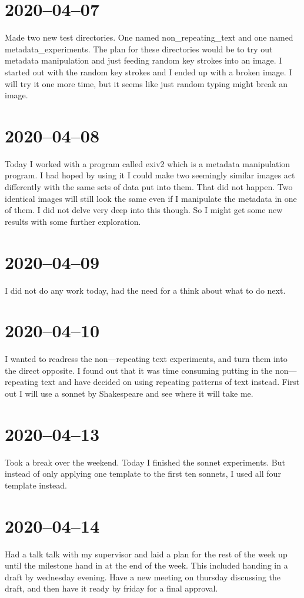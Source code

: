 \documentclass[12pt, letterpaper]{article}
\begin{document}
\section{2020--04--07}
Made two new test directories. One named non\_repeating\_text and one
named metadata\_experiments. The plan for these directories would be to try out
metadata manipulation and just feeding random key strokes into an image. I
started out with the random key strokes and I ended up with a broken image. I
will try it one more time, but it seems like just random typing might break an
image.

\section{2020--04--08}
Today I worked with a program called exiv2 which is a metadata manipulation
program. I had hoped by using it I could make two seemingly similar images act
differently with the same sets of data put into them. That did not happen. Two
identical images will still look the same even if I manipulate the metadata in
one of them. I did not delve very deep into this though. So I might get some new
results with some further exploration.

\section{2020--04--09}
I did not do any work today, had the need for a think about what to do next.

\section{2020--04--10}
I wanted to readress the non---repeating text experiments, and turn them into the
direct opposite. I found out that it was time consuming putting in the
non---repeating text and have decided on using repeating patterns of text instead.
First out I will use a sonnet by Shakespeare and see where it will take me.

\section{2020--04--13}
Took a break over the weekend. Today I finished the sonnet experiments. But
instead of only applying one template to the first ten sonnets, I used all four
template instead.

\section{2020--04--14}
Had a talk talk with my supervisor and laid a plan for the rest of the week up
until the milestone hand in at the end of the week. This included handing in a
draft by wednesday evening. Have a new meeting on thursday discussing the draft,
and then have it ready by friday for a final approval.
\end{document}
